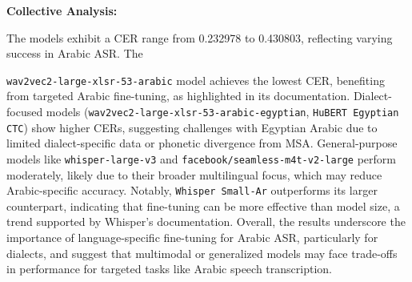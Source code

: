 \documentclass[12pt]{article}
\begin{document}
\textbf{Collective Analysis:}

The models exhibit a CER range from 0.232978 to 0.430803, reflecting varying success in Arabic ASR. The 

\texttt{wav2vec2-large-xlsr-53-arabic} model achieves the lowest CER, benefiting from targeted Arabic fine-tuning, as highlighted in its documentation. Dialect-focused models (\texttt{wav2vec2-large-xlsr-53-arabic-egyptian}, \texttt{HuBERT Egyptian CTC}) show higher CERs, suggesting challenges with Egyptian Arabic due to limited dialect-specific data or phonetic divergence from MSA. General-purpose models like \texttt{whisper-large-v3} and \texttt{facebook/seamless-m4t-v2-large} perform moderately, likely due to their broader multilingual focus, which may reduce Arabic-specific accuracy. Notably, \texttt{Whisper Small-Ar} outperforms its larger counterpart, indicating that fine-tuning can be more effective than model size, a trend supported by Whisper’s documentation. Overall, the results underscore the importance of language-specific fine-tuning for Arabic ASR, particularly for dialects, and suggest that multimodal or generalized models may face trade-offs in performance for targeted tasks like Arabic speech transcription.
\end{document}
